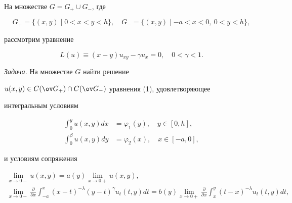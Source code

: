  




\maketitle 


\label{begin} 


 


На множестве $G=G_+\cup G_-$, где 


$$ 


G_+=\{(x,y)\mid 0<x<y<h\},\quad 


G_-=\{(x,y)\mid -a<x<0,\ 0<y<h\}, 


$$ 


рассмотрим уравнение 


\begin{equation} 


L(u)\equiv(x-y)u_{xy}-\gamma u_x=0,\quad 0<\gamma<1. 


\end{equation} 


 


{\it Задача.} На множестве $G$ найти решение 


$u(x,y)\in C(\ov G_+)\cap C(\ov G_-)$ уравнения (1), удовлетворяющее 


интегральным условиям 


\begin{align} 


\int^y_0 u(x,y)dx&=\varphi_1(y),\quad y\in[0,h],\\ 


\int^\beta_0 u(x,y)dy&=\varphi_2(x),\quad x\in[-a,0], 


\end{align} 


и условиям сопряжения 


\begin{gather} 


\lim_{x\to0-}u(x,y)=a(y)\lim_{x\to0+}u(x,y),\\ 


\lim_{x\to0-}\frac{\partial}{\partial x} 


\int^x_{-a}(x-t)^{-\lambda}(y-t)^\gamma u_t(t,y)dt= 


b(y)\lim_{x\to0+}\frac{\partial}{\partial x}\int^y_x 


(t-x)^{-\lambda}u_t(t,y)dt, 


\end{gather} 


